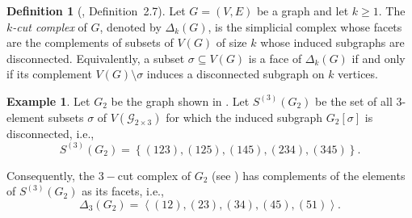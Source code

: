\documentclass[11pt,reqno,a4paper]{amsart}
\theoremstyle{definition}
\newtheorem{definition}{Definition}[section]
\newtheorem{example}{Example}[definition]
\theoremstyle{theorem}
\newcommand{\kcut}{\Delta_{k}}
\newcommand{\lno}{\left(}
\newcommand{\rno}{\right)}
\newcommand{\lsq}{\left[}
\newcommand{\rsq}{\right]}
\newcommand{\lcu}{\left\{}
\newcommand{\rcu}{\right\}}
\theoremstyle{remark}
\begin{document}
\begin{definition}[\cite{bayer2024cut}, Definition~2.7]\label{def:cutcomplex}
Let $G = (V, E)$ be a graph and let $k \ge 1$. 
The \emph{$k$-cut complex} of $G$, denoted by $\kcut \lno G \rno$, 
is the simplicial complex whose facets are the complements of subsets of $V(G)$ of size $k$ whose induced subgraphs are disconnected. 
Equivalently, a subset $\sigma \subseteq V(G)$ is a face of $\kcut\lno G\rno$ if and only if its complement $V(G) \setminus \sigma$ induces a disconnected subgraph on $k$ vertices.
\end{definition}

\begin{example}
    Let $G_2$ be the graph shown in  .    
    Let $S^{(3)}\lno G_2 \rno$ be the set of all 3-element subsets $\sigma$ of $V\lno \mathcal{G}_{2\times 3} \rno$ for which the induced subgraph $G_2 \lsq \sigma \rsq$ is disconnected, i.e., $$S^{(3)}\lno G_2 \rno = \lcu \lno 123 \rno, \lno 125 \rno, \lno 145 \rno, \lno 234 \rno, \lno 345 \rno\rcu.$$
    
    Consequently, the $3-$cut complex of $G_2$ (see ) has complements of the elements of $S^{(3)} \lno G_2 \rno$ as its facets, i.e., $$\Delta_3 \lno G_2 \rno = \left\langle \lno 12 \rno, \lno 23 \rno, \lno 34 \rno, \lno 45 \rno, \lno 51 \rno \right\rangle.$$
\end{example}
\end{document}
